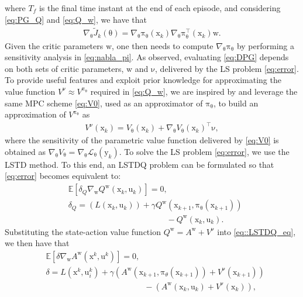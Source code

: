 \documentclass[10pt,twocolumn,twoside]{IEEEtran}
\newcommand{\vect}[1]{\ensuremath{\boldsymbol{\mathrm{#1}}}}
\begin{document}
where $T_f$ is the final time instant at the end of each episode, and considering \eqref{eq:PG_Q} and \eqref{eq:Q_w}, we have that
\begin{align}\label{eq:DPG}
   \nabla _{\vect\theta}\tilde J_k(\vect\theta)=\nabla_{\vect\theta}\vect\pi_{\vect\theta}\left(\vect x_k\right)\nabla_{\vect\theta}\vect\pi_{\vect\theta}^\top\left(\vect x_k\right) \vect w. 
\end{align}
Given the critic parameters $\vect w$, one then needs to compute $\nabla_{\vect\theta}\vect\pi_{\vect\theta}$ by performing a sensitivity analysis in \eqref{eq:nabla_pi}. As observed, evaluating \eqref{eq:DPG} depends on both sets of critic parameters, $\vect w$ and $\vect\nu$, delivered by the LS problem \eqref{eq:error}. To provide useful features and exploit prior knowledge for approximating the value function $V^{\vect\nu} \approx V^{\vect\pi_{\vect\theta}}$ required in \eqref{eq:Q_w}, we are inspired by \cite{10178119} and leverage the same MPC scheme \eqref{eq:V0}, used as an approximator of $\vect\pi_{\vect\theta}$, to build an approximation of $V^{\vect\pi_{\vect\theta}}$ as
\begin{align}\label{eq:nu}
    V^{\vect\nu}(\vect x_k)=V_{{\vect\theta} }(\vect x_k)+\nabla_{\vect\theta}V_{{\vect\theta} }(\vect x_k)^\top\vect\nu,
\end{align}
where the sensitivity of the parametric value function delivered by \eqref{eq:V0} is obtained as $\nabla_{\vect\theta}V_{{\vect\theta} }=\nabla_{\vect\theta} \mathcal{L}_{\vect \theta}(\vect y_k)$. To solve the LS problem \eqref{eq:error}, we use the LSTD method. To this end, an LSTDQ problem can be formulated so that \eqref{eq:error} becomes equivalent to:
\begin{align}\label{eq::LSTDQ_eq}
    &\mathbb{E}\left[\delta_Q\nabla_{\vect w} Q^{\vect w}(\vect x_k,\vect u_k)\right]=0,\\\nonumber
    &\delta_Q=\left(L\left(\vect x_k,\vect u_k\right)\right)+\gamma Q^{\vect w}\left({\vect x_{k+1},\vect\pi_{\vect\theta} (\vect x_{k+1})} \right)\\\nonumber
    &\qquad\qquad\qquad\qquad\qquad\qquad-Q^{\vect w}\left({\vect x_k,\vect u_k}\right).
\end{align}
Substituting the state-action value function $Q^{\vect w}=A^{\vect w}+V^{\vect\nu}$ into \eqref{eq::LSTDQ_eq}, we then have that
\begin{align}
    &\mathbb{E}\left[\delta\nabla_{\vect w} A^{\vect w}\left({\vect x^k,\vect u^k} \right)\right]=0,\\\nonumber
    &\delta=L\left(\vect x^k,\vect u_i^k\right)+\gamma \left(A^{\vect w}\left({\vect x_{k+1},\vect\pi_{\theta}(\vect x_{k+1})} \right)+V^{\vect\nu}\left({\vect x_{k+1}} \right)\right)\\\nonumber
    &\qquad\qquad\qquad\qquad\qquad\qquad-\left(A^{\vect w}\left({\vect x_k,\vect u_k}\right)+V^{\vect\nu}\left({\vect x_{k}} \right)\right),
\end{align}
\end{document}
